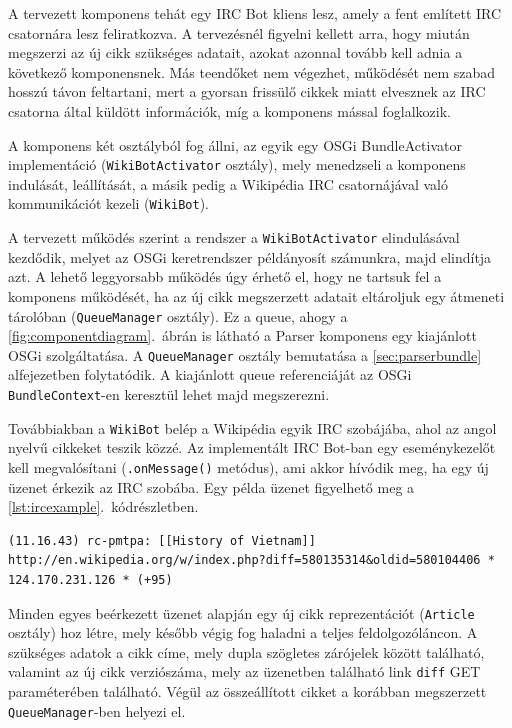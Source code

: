 A tervezett komponens tehát egy IRC Bot kliens lesz, amely a fent említett IRC csatornára lesz feliratkozva. A tervezésnél figyelni kellett arra, hogy miután megszerzi az új cikk szükséges adatait, azokat azonnal tovább kell adnia a következő komponensnek. Más teendőket nem végezhet, működését nem szabad hosszú távon feltartani, mert a gyorsan frissülő cikkek miatt elvesznek az IRC csatorna által küldött információk, míg a komponens mással foglalkozik.

A komponens két osztályból fog állni, az egyik egy OSGi BundleActivator implementáció (\texttt{WikiBotActivator} osztály), mely menedzseli a komponens indulását, leállítását, a másik pedig a Wikipédia IRC csatornájával való kommunikációt kezeli (\texttt{WikiBot}).

A tervezett működés szerint a rendszer a \texttt{WikiBotActivator} elindulásával kezdődik, melyet az OSGi keretrendszer példányosít számunkra, majd elindítja azt. A lehető leggyorsabb működés úgy érhető el, hogy ne tartsuk fel a komponens működését, ha az új cikk megszerzett adatait eltároljuk egy átmeneti tárolóban (\texttt{QueueManager} osztály). Ez a queue, ahogy a \ref{fig:componentdiagram}.~ábrán is látható a Parser komponens egy kiajánlott OSGi szolgáltatása. A \texttt{QueueManager} osztály bemutatása a \ref{sec:parserbundle} alfejezetben folytatódik. A kiajánlott queue referenciáját az OSGi \texttt{BundleContext}-en keresztül lehet majd megszerezni.

Továbbiakban a \texttt{WikiBot} belép a Wikipédia egyik IRC szobájába, ahol az angol nyelvű cikkeket teszik közzé. Az implementált IRC Bot-ban egy eseménykezelőt kell megvalósítani (\texttt{.onMessage()} metódus), ami akkor hívódik meg, ha egy új üzenet érkezik az IRC szobába. Egy példa üzenet figyelhető meg a \ref{lst:ircexample}.~kódrészletben.

\begin{lstlisting}[label={lst:ircexample}, caption=Példa üzenet az angol nyelvű Wikipédia IRC csatornájából,breaklines=true]
(11.16.43) rc-pmtpa: [[History of Vietnam]]  http://en.wikipedia.org/w/index.php?diff=580135314&oldid=580104406 * 124.170.231.126 * (+95) 
\end{lstlisting}

Minden egyes beérkezett üzenet alapján egy új cikk reprezentációt (\texttt{Article} osztály) hoz létre, mely később végig fog haladni a teljes feldolgozóláncon. A szükséges adatok a cikk címe, mely dupla szögletes zárójelek között található, valamint az új cikk verziószáma, mely az üzenetben található link \texttt{diff} GET paraméterében található. Végül az összeállított cikket a korábban megszerzett \texttt{QueueManager}-ben helyezi el.

